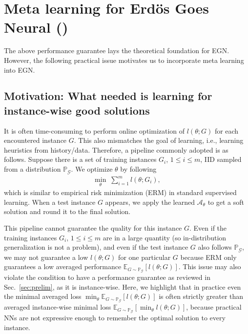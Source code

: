 \section{Meta learning for Erd\"{o}s Goes Neural (\proj)}
The above performance guarantee lays the theoretical foundation for EGN. However, the following practical issue motivates us to incorporate meta learning into EGN.

\subsection{Motivation: What needed is learning for instance-wise good solutions}
 It is often time-consuming to perform online optimization of $l(\theta;G)$ for each encountered instance $G$. This also mismatches the goal of learning, i.e., learning heuristics from history/data. Therefore, a  pipeline commonly adopted is as follows. Suppose there is a set of training instances $G_i$, $1\leq i\leq m$, IID sampled from a distribution $\mathbb{P}_{\mathcal{G}}$. We optimize $\theta$ by following 
\begin{equation}
\label{eq:previous_goal}
\begin{aligned}
\min_{\theta} \;\sum_{i=1}^m l(\theta;G_i),
\end{aligned}
\end{equation}
which is similar to empirical risk minimization (ERM) in standard supervised learning. When a test instance $G$ appears, we apply the learned $\mathcal{A}_{\theta}$ to get a soft solution and round it to the final solution.

This pipeline cannot guarantee the quality for this instance $G$. Even if the training instances $G_i$, $1\leq i\leq m$ are in a large quantity (so in-distribution generalization is not a problem), and even if the test instance $G$ also follows $\mathbb{P}_{\mathcal{G}}$, we may not guarantee a low $l(\theta;G)$ for one particular $G$ because ERM only guarantees a low averaged performance $\mathbb{E}_{G\sim\mathbb{P}_{\mathcal{G}}}[l(\theta;G)]$.  This issue may also violate the condition to have a performance guarantee as reviewed in Sec.~\ref{sec:prelim}, as it is instance-wise. Here, we highlight that in practice even the minimal averaged loss $\min_{\theta} \mathbb{E}_{G\sim\mathbb{P}_{\mathcal{G}}}[l(\theta;G)]$ is often strictly greater than averaged instance-wise minimal loss $\mathbb{E}_{G\sim\mathbb{P}_{\mathcal{G}}}[\min_{\theta} l(\theta;G)]$, because practical NNs are not expressive enough to remember the optimal solution to every instance.%

